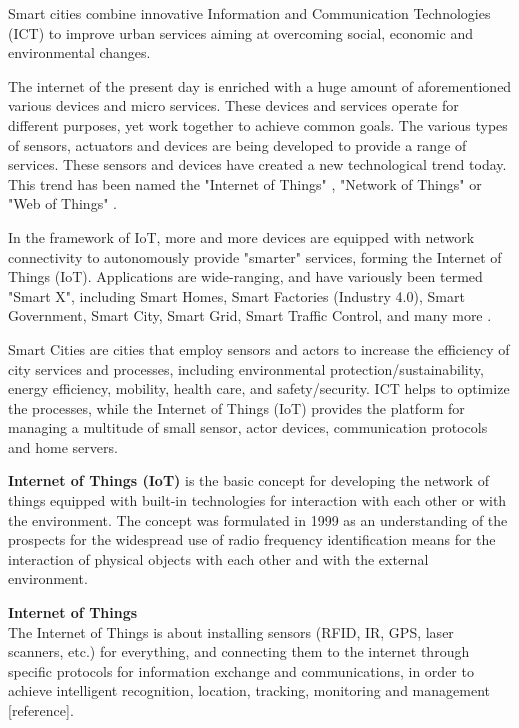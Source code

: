 Smart cities combine innovative Information and Communication Technologies (ICT) to improve urban services aiming at overcoming social, economic and environmental changes. 

The internet of the present day is enriched with a huge amount of aforementioned various devices and micro services. These devices and services operate for different purposes, yet work together to achieve common goals. The various types of sensors, actuators and devices are being developed to provide a range of services. These sensors and devices have created a new technological trend today. This trend has been named the "Internet of Things" \cite{WeberRomana2010}, "Network of Things" \cite{Gubbi+2013} or "Web of Things" \cite{Guinard+2010}. 

In the framework of IoT, more and more devices are equipped with network connectivity to autonomously provide "smarter" services, forming the Internet of Things (IoT). Applications are wide-ranging, and have variously been termed "Smart X", including Smart Homes, Smart Factories (Industry 4.0), Smart Government, Smart City, Smart Grid, Smart Traffic Control, and many more \cite{Kuryazov+2018}.

Smart Cities are cities that employ sensors and actors to increase the efficiency of city services and processes, including environmental protection/sustainability, energy efficiency, mobility, health care, and safety/security. ICT helps to optimize the processes, while the Internet of Things (IoT) provides the platform for managing a multitude of small sensor, actor devices, communication protocols and home servers.

\textbf{Internet of Things (IoT)} \cite{WeberRomana2010} is the basic concept for developing the network of things equipped with built-in technologies for interaction with each other or with the environment. The concept was formulated in 1999 as an understanding of the prospects for the widespread use of radio frequency identification means for the interaction of physical objects with each other and with the external environment. 
\begin{definition}
\textbf{Internet of Things}\label{definition:internetOfThings}\\
The Internet of Things is about installing sensors (RFID, IR, GPS, laser scanners, etc.) for everything, and connecting them to the internet through specific protocols for information exchange and communications, in order to achieve intelligent recognition, location, tracking, monitoring and management [reference].
\end{definition}

